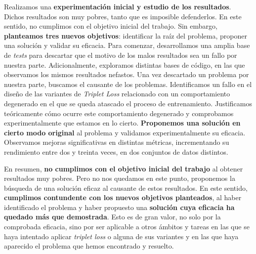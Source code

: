 Realizamos una \textbf{experimentación inicial y estudio de los resultados}. Dichos resultados son muy pobres, tanto que es imposible defenderlos. En este sentido, no cumplimos con el objetivo inicial del trabajo. Sin embargo, \textbf{planteamos tres nuevos objetivos}: identificar la raíz del problema, proponer una solución y validar su eficacia. Para comenzar, desarrollamos una amplia base de \textit{tests} para descartar que el motivo de los malos resultados sea un fallo por nuestra parte. Adicionalmente, exploramos distintas bases de código, en las que observamos los mismos resultados nefastos. Una vez descartado un problema por nuestra parte, buscamos el causante de los problemas. Identificamos un fallo en el diseño de las variantes de \textit{Triplet Loss} relacionado con un comportamiento degenerado en el que se queda atascado el proceso de entrenamiento. Justificamos teóricamente cómo ocurre este comportamiento degenerado y comprobamos experimentalmente que estamos en lo cierto. \textbf{Proponemos una solución en cierto modo original} al problema y validamos experimentalmente su eficacia. Observamos mejoras significativas en distintas métricas, incrementando su rendimiento entre dos y treinta veces, en dos conjuntos de datos distintos.

En resumen, \textbf{no cumplimos con el objetivo inicial del trabajo} al obtener resultados muy pobres. Pero no nos quedamos en este punto, proponemos la búsqueda de una solución eficaz al causante de estos resultados. En este sentido, \textbf{cumplimos contundente con los nuevos objetivos planteados}, al haber identificado el problema y haber propuesto una \textbf{solución cuya eficacia ha quedado más que demostrada}. Esto es de gran valor, no solo por la comprobada eficacia, sino por ser aplicable a otros ámbitos y tareas en las que se haya intentado aplicar \textit{triplet loss} o alguna de sus variantes y en las que haya aparecido el problema que hemos encontrado y resuelto.

\endinput
